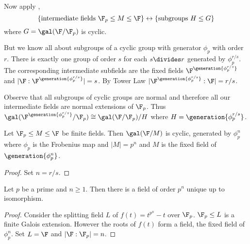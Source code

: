 \documentclass[a4paper]{article}
\begin{document}
Now apply ,
\[
  \{\text{intermediate fields } \F_p \leq M \leq \F\} \leftrightarrow \{\text{subgroups } H \leq G \}
\]
where \(G = \gal(\F/\F_p)\) is cyclic.

But we know all about subgroups of a cyclic group with generator \(\phi_p\) with order \(r\). There is exactly one group of order \(s\) for each \(s \divides r\) generated by \(\phi_p^{r/s}\). The corresponding intermediate subfields are the fixed fields \(\F^{\generation{\phi_p^{r/s}}}\) and \(|\F:\F^{\generation{\phi_p^{r/s}}}| = s\). By Tower Law \(|\F^{\generation{\phi_p^{r/s}}}:\F| = r/s\).

Observe that all subgroups of cyclic groups are normal and therefore all our intermediate fields are normal extensions of \(\F_p\). Thus \(\gal(\F^{\generation{\phi_p^{r/s}}}/\F_p) \cong \gal(\F/\F_p)/H\) where \(H = \generation{\phi_p^{r/s}}\).

\begin{corollary}
  Let \(\F_p \leq M \leq \F\) be finite fields. Then \(\gal(\F/M)\) is cyclic, generated by \(\phi_p^n\) where \(\phi_p\) is the Frobenius map and \(|M| = p^n\) and \(M\) is the fixed field of \(\generation{\phi_p^n}\).
\end{corollary}

\begin{proof}
  Set \(n = r/s\).
\end{proof}

\begin{theorem}
  Let \(p\) be a prime and \(n \geq 1\). Then there is a field of order \(p^n\) unique up to isomorphism.
\end{theorem}

\begin{proof}
  Consider the splitting field \(L\) of \(f(t) = t^{p^n} - t\) over \(\F_p\). \(\F_p \leq L\) is a finite Galois extension. However the roots of \(f(t)\) form a field, the fixed field of \(\phi_p^n\). Set \(L = \F\) and \(|\F:\F_p| = n\).
\end{proof}
\end{document}
